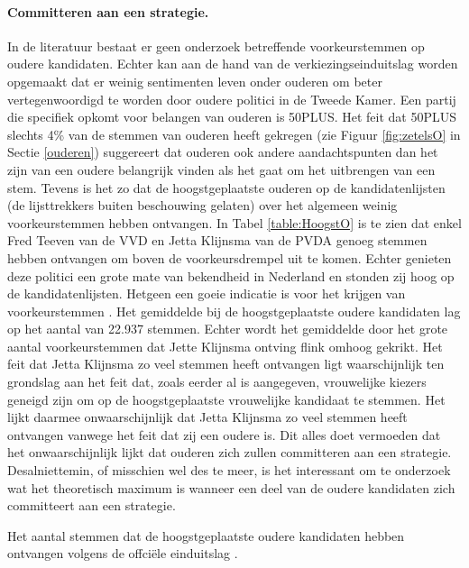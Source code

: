 \paragraph{Committeren aan een strategie.}
In de literatuur bestaat er geen onderzoek betreffende voorkeurstemmen op oudere kandidaten. Echter kan aan de hand van de verkiezingseinduitslag worden opgemaakt dat er weinig sentimenten leven onder ouderen om beter vertegenwoordigd te worden door oudere politici in de Tweede Kamer. Een partij die specifiek opkomt voor belangen van ouderen is 50PLUS. Het feit dat 50PLUS slechts 4\% van de stemmen van ouderen heeft gekregen (zie Figuur \ref{fig:zetelsO} in Sectie \ref{ouderen}) suggereert dat ouderen ook andere aandachtspunten dan het zijn van een oudere belangrijk vinden als het gaat om het uitbrengen van een stem. Tevens is het zo dat de hoogstgeplaatste ouderen op de kandidatenlijsten (de lijsttrekkers buiten beschouwing gelaten) over het algemeen weinig voorkeurstemmen hebben ontvangen. In Tabel \ref{table:HoogstO} is te zien dat enkel Fred Teeven van de VVD en Jetta Klijnsma van de PVDA genoeg stemmen hebben ontvangen om boven de voorkeursdrempel uit te komen. Echter genieten deze politici een grote mate van bekendheid in Nederland en stonden zij hoog op de kandidatenlijsten. Hetgeen een goeie indicatie is voor het krijgen van voorkeurstemmen \citep{van2012tweede}. Het gemiddelde bij de hoogstgeplaatste oudere kandidaten lag op het aantal van 22.937 stemmen. Echter wordt het gemiddelde door het grote aantal voorkeurstemmen dat Jette Klijnsma ontving flink omhoog gekrikt. Het feit dat Jetta Klijnsma zo veel stemmen heeft ontvangen ligt waarschijnlijk ten grondslag aan het feit dat, zoals eerder al is aangegeven, vrouwelijke kiezers geneigd zijn om op de hoogstgeplaatste vrouwelijke kandidaat te stemmen. Het lijkt daarmee onwaarschijnlijk dat Jetta Klijnsma zo veel stemmen heeft ontvangen vanwege het feit dat zij een oudere is. Dit alles doet vermoeden dat het onwaarschijnlijk lijkt dat ouderen zich zullen committeren aan een strategie. Desalniettemin, of misschien wel des te meer, is het interessant om te onderzoek wat het theoretisch maximum is wanneer een deel van de oudere kandidaten zich committeert aan een strategie. \\

\begin{table}[H]
\centering
	\begin{footnotesize}
		
	\end{footnotesize}
			\caption{Het aantal stemmen dat de hoogstgeplaatste oudere kandidaten hebben ontvangen volgens de offci\"{e}le einduitslag \citep{Kiesraad_uitslag}.}
\label{table:HoogstO} 
\end{table}

